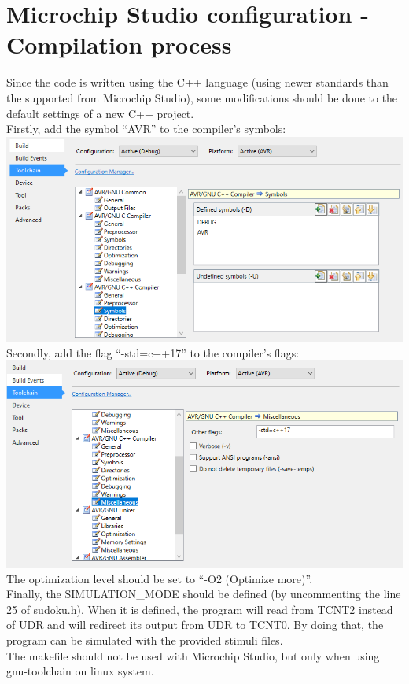 \documentclass[12pt, a4, hidelinks]{article}
\begin{document}
\section*{Microchip Studio configuration - Compilation process}
Since the code is written using the C++ language (using newer standards than the supported from Microchip Studio), some modifications should be done to the default settings of a new C++ project.  \\
Firstly, add the symbol “AVR” to the compiler’s symbols:\\
\includegraphics[scale=0.75]{CPP_AVR_SYMBOL.png} \\
Secondly, add the flag “-std=c++17” to the compiler’s flags:\\
\includegraphics[scale=0.75]{CPP_STD_17.png}  \\
The optimization level should be set to “-O2 (Optimize more)''.\\
Finally, the SIMULATION\_MODE should be defined (by uncommenting the line 25 of sudoku.h). When it is defined, the program will read from TCNT2 instead of UDR and will redirect its output from UDR to TCNT0. By doing that, the program can be simulated with the provided stimuli files. \\
The makefile should not be used with Microchip Studio, but only when using gnu-toolchain on linux system.
\end{document}
